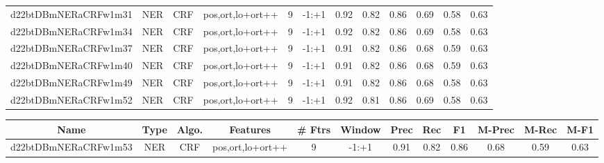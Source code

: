 \documentclass[a4paper]{article}
\begin{document}
\begin{landscape}
\begin{center}
\begin{tabular}{ |c|c|c|c|c|c|c|c|c|c|c|c|}
 	
 
 	
 		
 		\small{ d22btDBmNERaCRFw1m31 } & NER & CRF & pos,ort,lo+ort++  &  9 &  -1:+1  &  0.92 & 0.82 & 0.86  &  0.69 & 0.58 & 0.63 \\
 		

 	
 
 	
 		
 		\small{ d22btDBmNERaCRFw1m34 } & NER & CRF & pos,ort,lo+ort++  &  9 &  -1:+1  &  0.92 & 0.82 & 0.86  &  0.69 & 0.58 & 0.63 \\
 		

 	
 
 	
 		
 		\small{ d22btDBmNERaCRFw1m37 } & NER & CRF & pos,ort,lo+ort++  &  9 &  -1:+1  &  0.91 & 0.82 & 0.86  &  0.68 & 0.59 & 0.63 \\
 		

 	
 
 	
 		
 		\small{ d22btDBmNERaCRFw1m40 } & NER & CRF & pos,ort,lo+ort++  &  9 &  -1:+1  &  0.91 & 0.82 & 0.86  &  0.68 & 0.59 & 0.63 \\
 		

 	
 
 	
 		
 		\small{ d22btDBmNERaCRFw1m49 } & NER & CRF & pos,ort,lo+ort++  &  9 &  -1:+1  &  0.91 & 0.82 & 0.86  &  0.68 & 0.58 & 0.63 \\
 		

 	
 
 	
 		
 		\small{ d22btDBmNERaCRFw1m52 } & NER & CRF & pos,ort,lo+ort++  &  9 &  -1:+1  &  0.92 & 0.81 & 0.86  &  0.69 & 0.58 & 0.63 \\
 		
 \hline
\end{tabular}
\end{center}




\begin{center}
\begin{tabular}{ |c|c|c|c|c|c|c|c|c|c|c|c|} 
 \hline
 	Name & Type & Algo. & Features & \# Ftrs & Window & Prec & Rec & F1 & M-Prec & M-Rec & M-F1\\
 \hline

 		

 	
 
 	
 		
 		\small{ d22btDBmNERaCRFw1m53 } & NER & CRF & pos,ort,lo+ort++  &  9 &  -1:+1  &  0.91 & 0.82 & 0.86  &  0.68 & 0.59 & 0.63 \\
 		


\end{tabular}
\end{center}
\end{landscape}
\end{document}

